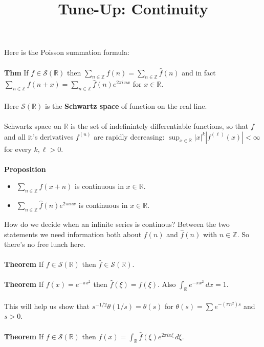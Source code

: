 \documentclass[12pt]{article}
\title{Tune-Up: Continuity}
\date{}
\begin{document}
\sffamily

\maketitle

\noindent Here is the Poisson summation formula: \\ \\
\textbf{Thm} If $f \in \mathcal{S}(\mathbb{R})$ then $\displaystyle \sum_{n \in \mathbb{Z}} f(n) = \sum_{n \in \mathbb{Z}} \hat{f}(n)$ and in fact $\displaystyle \sum_{n \in \mathbb{Z}} f(n+x) = \sum_{n \in \mathbb{Z}} \hat{f}(n) e^{2\pi i \, n x}$ for $x \in \mathbb{R}$. \\ \\
Here $\mathcal{S}(\mathbb{R})$ is the \textbf{Schwartz space} of function on the real line.  \\ \\ 
Schwartz space on $\mathbb{R}$ is the set of indefinintely differentiable functions, so that $f$ and all it's derivatives $f^{(n)}$ are rapidly decreasing: $\displaystyle \sup_{x \in \mathbb{R}} |x|^k | f^({\ell})(x)| < \infty $ for every $k, \ell > 0$.\\ \\
\textbf{Proposition}
\begin{itemize}
\item $\displaystyle \sum_{n \in \mathbb{Z}} f(x+n) $ is continuous in $x \in \mathbb{R}$.
\item $\displaystyle  \sum_{n \in \mathbb{Z}} \hat{f}(n)e^{2\pi inx}$ is continuous in $x \in \mathbb{R}$.
\end{itemize}
How do we decide when an infinite series is continous? Between the two statements we need information both about $f(n)$ and $\hat{f}(n)$ with $n \in \mathbb{Z}$.  So there's no free lunch here.\\ \\
\textbf{Theorem} If $f \in \mathcal{S}(\mathbb{R})$ then $\hat{f} \in \mathcal{S}(\mathbb{R})$. \\ \\
\textbf{Theorem} If $f(x) = e^{-\pi x^2}$ then $\hat{f}(\xi) = f(\xi)$.  Also $\int_{\mathbb{R}} e^{-\pi x^2 } \, dx = 1$. \\ \\  This will help us show that $s^{-1/2}\theta(1/s) = \theta(s)$ for $\theta(s) = \sum e^{-(\pi n^2) s}$ and $s > 0$. \\ \\
\textbf{Theorem} If $f \in \mathcal{S}(\mathbb{R})$ then $\displaystyle f(x) = \int_\mathbb{R} \hat{f}(\xi) e^{2\pi i x\xi} \, d\xi$. \\ \\
\end{document}

